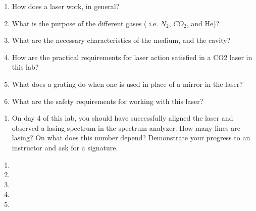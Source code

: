 \documentclass{../signatures}
\begin{document}
\maketitle

\names

\prelab

\begin{enumerate}

    \item How does a laser work, in general?
    
    \item What is the purpose of the different gases ( i.e. $N_2$, $CO_2$, and He)?

    \item What are the necessary characteristics of the medium, and the cavity?

    \item How are the practical requirements for laser action satisfied in a CO2 laser in this lab?

    \item What does a grating do when one is used in place of a mirror in the laser?

    \item What are the safety requirements for working with this laser?
       \\[36pt]
\end{enumerate}

\prelabsignatures

\midlab

\begin{enumerate}

    \item On day 4 of this lab, you should have successfully aligned the laser and observed a lasing spectrum in the spectrum analyzer. How many lines are lasing? On what does this number depend? Demonstrate your progress to an instructor and ask for a signature. 
\\[36pt]
\end{enumerate}


\pagebreak

\checkpointsection 

\begin{enumerate}

\item {}

\item {}

\item {}

\item {}

\item {}

\end{enumerate}
\end{document}
